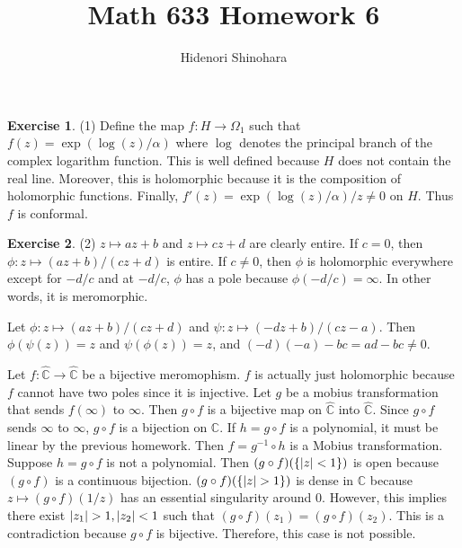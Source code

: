\documentclass[12pt, psamsfonts]{amsart}
\theoremstyle{definition}
\newtheorem*{exer}{Exercise}
\theoremstyle{remark}
\numberwithin{equation}{section}
\begin{document}
\title{Math 633 Homework 6}
\author{Hidenori Shinohara}
\maketitle


\begin{exer}{(1)}
  Define the map $f: H \rightarrow \Omega_1$ such that $f(z) = \exp(\log(z)/\alpha)$ where $\log$ denotes the principal branch of the complex logarithm function.
  This is well defined because $H$ does not contain the real line.
  Moreover, this is holomorphic because it is the composition of holomorphic functions.
  Finally, $f'(z) = \exp(\log(z)/\alpha) / z \ne 0$ on $H$.
  Thus $f$ is conformal.
\end{exer}

\begin{exer}{(2)}
  $z \mapsto az + b$ and $z \mapsto cz + d$ are clearly entire.
  If $c = 0$, then $\phi: z \mapsto (az + b) / (cz + d)$ is entire.
  If $c \ne 0$, then $\phi$ is holomorphic everywhere except for $-d / c$ and at $-d / c$, $\phi$ has a pole because $\phi(-d / c) = \infty$.
  In other words, it is meromorphic.

  Let $\phi: z \mapsto (az + b) / (cz + d)$ and $\psi: z \mapsto (-dz + b) / (cz - a)$.
  Then $\phi(\psi(z)) = z$ and $\psi(\phi(z)) = z$, and $(-d)(-a) - bc = ad - bc \ne 0$.

  Let $f:\hat{\mathbb{C}} \rightarrow \hat{\mathbb{C}}$ be a bijective meromophism.
  $f$ is actually just holomorphic because $f$ cannot have two poles since it is injective.
  Let $g$ be a mobius transformation that sends $f(\infty)$ to $\infty$.
  Then $g \circ f$ is a bijective map on $\hat{\mathbb{C}}$ into $\hat{\mathbb{C}}$.
  Since $g \circ f$ sends $\infty$ to $\infty$, $g \circ f$ is a bijection on $\mathbb{C}$.
  If $h = g \circ f$ is a polynomial, it must be linear by the previous homework.
  Then $f = g^{-1} \circ h$ is a Mobius transformation.
  Suppose $h = g \circ f$ is not a polynomial.
  Then $(g \circ f)(\{ \abs{z} < 1 \})$ is open because $(g \circ f)$ is a continuous bijection.
  $(g \circ f)(\{ \abs{z} > 1 \})$ is dense in $\mathbb{C}$ because $z \mapsto (g \circ f)(1 / z)$ has an essential singularity around $0$.
  However, this implies there exist $\abs{z_1} > 1, \abs{z_2} < 1$ such that $(g \circ f)(z_1) = (g \circ f)(z_2)$.
  This is a contradiction because $g \circ f$ is bijective.
  Therefore, this case is not possible.
\end{exer}
\end{document}
